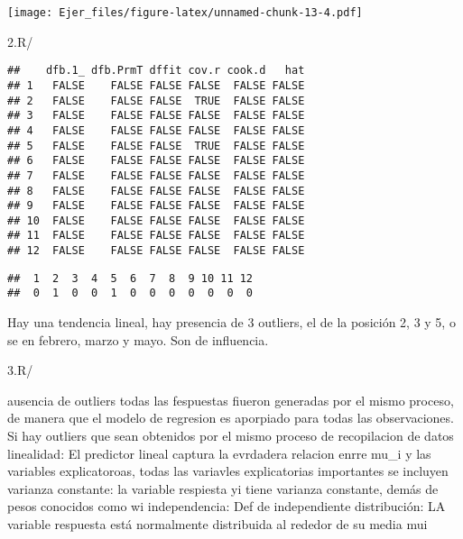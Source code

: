 \documentclass[
]{article}
\newenvironment{Shaded}{\begin{snugshade}}{\end{snugshade}}
\newcommand{\FunctionTok}[1]{\textcolor[rgb]{0.00,0.00,0.00}{#1}}
\newcommand{\NormalTok}[1]{#1}
\newcommand{\SpecialCharTok}[1]{\textcolor[rgb]{0.00,0.00,0.00}{#1}}
\begin{document}
\texttt{[image: Ejer\_files/figure-latex/unnamed-chunk-13-4.pdf]}

2.R/

\begin{Shaded}
\end{Shaded}

\begin{verbatim}
##    dfb.1_ dfb.PrmT dffit cov.r cook.d   hat
## 1   FALSE    FALSE FALSE FALSE  FALSE FALSE
## 2   FALSE    FALSE FALSE  TRUE  FALSE FALSE
## 3   FALSE    FALSE FALSE FALSE  FALSE FALSE
## 4   FALSE    FALSE FALSE FALSE  FALSE FALSE
## 5   FALSE    FALSE FALSE  TRUE  FALSE FALSE
## 6   FALSE    FALSE FALSE FALSE  FALSE FALSE
## 7   FALSE    FALSE FALSE FALSE  FALSE FALSE
## 8   FALSE    FALSE FALSE FALSE  FALSE FALSE
## 9   FALSE    FALSE FALSE FALSE  FALSE FALSE
## 10  FALSE    FALSE FALSE FALSE  FALSE FALSE
## 11  FALSE    FALSE FALSE FALSE  FALSE FALSE
## 12  FALSE    FALSE FALSE FALSE  FALSE FALSE
\end{verbatim}

\begin{Shaded}
\end{Shaded}

\begin{verbatim}
##  1  2  3  4  5  6  7  8  9 10 11 12 
##  0  1  0  0  1  0  0  0  0  0  0  0
\end{verbatim}

Hay una tendencia lineal, hay presencia de 3 outliers, el de la posición
2, 3 y 5, o se en febrero, marzo y mayo. Son de influencia.

3.R/

ausencia de outliers todas las fespuestas fiueron generadas por el mismo
proceso, de manera que el modelo de regresion es aporpiado para todas
las observaciones. Si hay outliers que sean obtenidos por el mismo
proceso de recopilacion de datos linealidad: El predictor lineal captura
la evrdadera relacion enrre mu\_i y las variables explicatoroas, todas
las variavles explicatorias importantes se incluyen varianza constante:
la variable respiesta yi tiene varianza constante, demás de pesos
conocidos como wi independencia: Def de independiente distribución: LA
variable respuesta está normalmente distribuida al rededor de su media
mui
\end{document}
